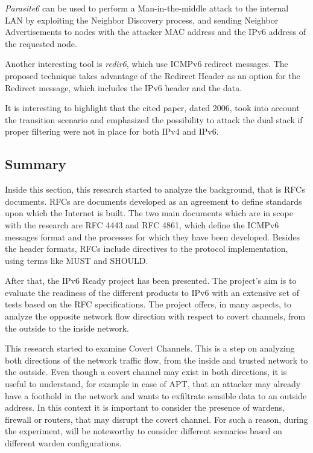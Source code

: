 \documentclass[12pt]{article}
\begin{document}
\textit{Parasite6} can be used to perform a Man-in-the-middle attack to the internal LAN by exploiting the Neighbor Discovery process, and sending Neighbor Advertisements to nodes with the attacker MAC address and the IPv6 address of the requested node\cite{thc}.

Another interesting tool is \textit{redir6}, which use ICMPv6 redirect messages. The proposed technique takes advantage of the Redirect Header as an option for the Redirect message, which includes the IPv6 header and the data\cite{thc}.

It is interesting to highlight that the cited paper, dated 2006, took into account the transition scenario and emphasized the possibility to attack the dual stack if proper filtering were not in place for both IPv4 and IPv6.


\subsection{Summary}

Inside this section, this research started to analyze the background, that is RFCs documents. RFCs are documents developed as an agreement to define standards upon which the Internet is built. The two main documents which are in scope with the research are RFC 4443 and RFC 4861, which define the ICMPv6 messages format and the processes for which they have been developed. Besides the header formats, RFCs include directives to the protocol implementation, using terms like MUST and SHOULD. 

After that, the IPv6 Ready project has been presented. The project's aim is to evaluate the readiness of the different products to IPv6 with an extensive set of tests based on the RFC specifications. The project offers, in many aspects, to analyze the opposite network flow direction with respect to covert channels, from the outside to the inside network.

This research started to examine Covert Channels. This is a step on analyzing both directions of the network traffic flow, from the inside and trusted network to the outside. Even though a covert channel may exist in both directions, it is useful to understand, for example in case of APT, that an attacker may already have a foothold in the network and wants to exfiltrate sensible data to an outside address. In this context it is important to consider the presence of wardens, firewall or routers, that may disrupt the covert channel. For such a reason, during the experiment, will be noteworthy to consider different scenarios based on different warden configurations.
\end{document}
